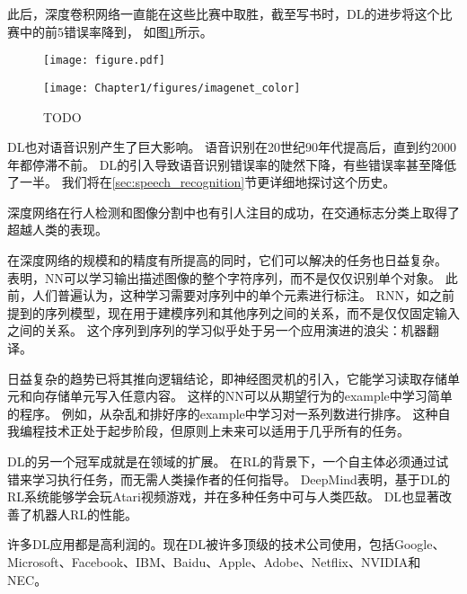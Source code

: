 此后，深度卷积网络一直能在这些比赛中取胜，截至写书时，\gls{DL}的进步将这个比赛中的前5错误率降到， 如图\ref{fig:chap1_imagenet_color}所示。
\begin{figure}[!htb]
\ifOpenSource
\centerline{\texttt{[image: figure.pdf]}}
\else
\centerline{\texttt{[image: Chapter1/figures/imagenet\_color]}}
\fi
\caption{TODO}
\label{fig:chap1_imagenet_color}
\end{figure}


\gls{DL}也对语音识别产生了巨大影响。
语音识别在20世纪90年代提高后，直到约2000年都停滞不前。
\gls{DL}的引入\citep{dahl2010phonerec,Deng-2010,Seide2011,Hinton-et-al-2012}导致语音识别错误率的陡然下降，有些错误率甚至降低了一半。 
我们将在\ref{sec:speech_recognition}节更详细地探讨这个历史。

深度网络在行人检测和图像分割中也有引人注目的成功\citep{sermanet-cvpr-13,Farabet-et-al-2013,couprie-iclr-13}，在交通标志分类上取得了超越人类的表现\citep{Ciresan-et-al-2012}。

在深度网络的规模和的精度有所提高的同时，它们可以解决的任务也日益复杂。
\citet{Goodfellow+et+al-ICLR2014a}表明，\gls{NN}可以学习输出描述图像的整个字符序列，而不是仅仅识别单个对象。
此前，人们普遍认为，这种学习需要对序列中的单个元素进行标注\citep{Gulcehre+Bengio-arxiv-2013}。
\gls{RNN}，如之前提到的序列模型，现在用于建模序列和其他序列之间的关系，而不是仅仅固定输入之间的关系。
这个序列到序列的学习似乎处于另一个应用演进的浪尖：机器翻译\citep{Sutskever-et-al-NIPS2014,Bahdanau-et-al-ICLR2015-small}。


日益复杂的趋势已将其推向逻辑结论，即神经图灵机\citep{Graves-et-al-arxiv2014}的引入，它能学习读取存储单元和向存储单元写入任意内容。
这样的\gls{NN}可以从期望行为的\gls{example}中学习简单的程序。
例如，从杂乱和排好序的\gls{example}中学习对一系列数进行排序。
这种自我编程技术正处于起步阶段，但原则上未来可以适用于几乎所有的任务。


\gls{DL}的另一个冠军成就是在领域的扩展。
在\gls{RL}的背景下，一个自主体必须通过试错来学习执行任务，而无需人类操作者的任何指导。
DeepMind表明，基于\gls{DL}的\gls{RL}系统能够学会玩Atari视频游戏，并在多种任务中可与人类匹敌\citep{Mnih-et-al-2015}。
\gls{DL}也显著改善了机器人\gls{RL}的性能\citep{finn2015learning}。

许多\gls{DL}应用都是高利润的。现在\gls{DL}被许多顶级的技术公司使用，包括Google、Microsoft、Facebook、IBM、Baidu、Apple、Adobe、Netflix、NVIDIA和NEC。

